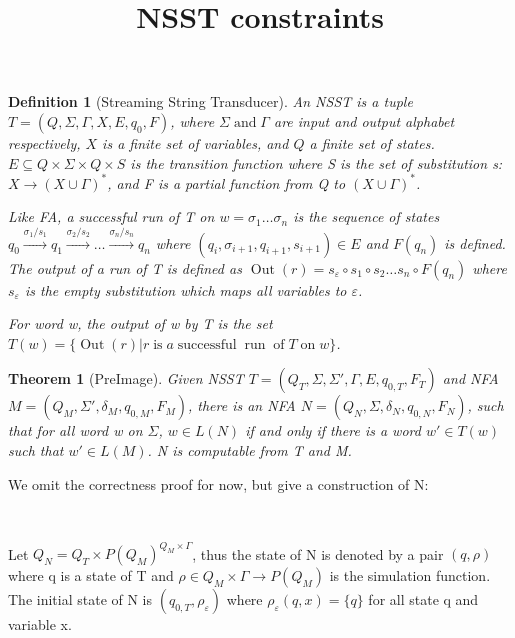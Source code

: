 \documentclass{article}
\newcommand{\tmop}[1]{\ensuremath{\operatorname{#1}}}
\newtheorem{definition}{Definition}
{\theorembodyfont{\rmfamily}\newtheorem{note}{Note}}
{\theorembodyfont{\rmfamily}\newtheorem{remark}{Remark}}
\newtheorem{theorem}{Theorem}
\begin{document}
\title{NSST constraints}

\maketitle

\begin{definition}[Streaming String Transducer]
  An NSST{\cite{filiotCopyfulStreamingString2017}} is a tuple $T = (Q, \Sigma,
  \Gamma, X, E, q_0, F)$, where $\Sigma \tmop{and} \Gamma$ are input and
  output alphabet respectively, $X$ is a finite set of variables, and $Q$ a
  finite set of states. $E \subseteq Q \times \Sigma \times Q \times S$ is the
  transition function where S is the set of substitution s:$X \rightarrow (X
  \cup \Gamma)^{\ast}$, and F is a partial function from Q to $(X \cup
  \Gamma)^{\ast}$.
  
  Like FA, a successful run of T on $w = \sigma_1 \ldots \sigma_n$ is the
  sequence of states $q_0 \xrightarrow{\sigma_1 / s_1} q_1
  \xrightarrow{\sigma_2 / s_2} \ldots \xrightarrow{\sigma_n / s_n} q_n$ where
  $(q_i, \sigma_{i + 1}, q_{i + 1}, s_{i + 1}) \in E$ and $F (q_n)$ is
  defined. The output of a run of T is defined as $\tmop{Out} (r) =
  s_{\varepsilon} \circ s_1 \circ s_2 \ldots s_n \circ F (q_n)$ where
  $s_{\varepsilon}$ is the empty substitution which maps all variables to
  $\varepsilon$.
  
  For word w, the output of w by T is the set $T (w) = \{ \tmop{Out} (r) |r
  \tmop{is} a \tmop{successful} \tmop{run} \tmop{of} T \tmop{on} w \}$.
\end{definition}

\begin{theorem}[PreImage]
  Given NSST $T = (Q_T, \Sigma, \Sigma', \Gamma, E, q_{0, T}, F_T)$ and NFA $M
  = (Q_M, \Sigma', \delta_M, q_{0, M}, F_M)$, there is an NFA $N = (Q_N,
  \Sigma, \delta_N, q_{0, N}, F_N)$, such that for all word w on $\Sigma$, $w
  \in L (N)$ if and only if there is a word $w' \in T (w)$ such that $w' \in L
  (M)$. N is computable from T and M.
\end{theorem}

We omit the correctness proof for now, but give a construction of N:

\

Let $Q_N = Q_T \times P (Q_M)^{Q_M \times \Gamma}$, thus the state of N is
denoted by a pair $(q, \rho)$ where q is a state of T and $\rho \in Q_M \times
\Gamma \rightarrow P (Q_M)$ is the simulation function. The initial state of N
is $(q_{0, T}, \rho_{\varepsilon})$ where $\rho_{\varepsilon} (q, x) = \{ q
\}$ for all state q and variable x.
\end{document}
